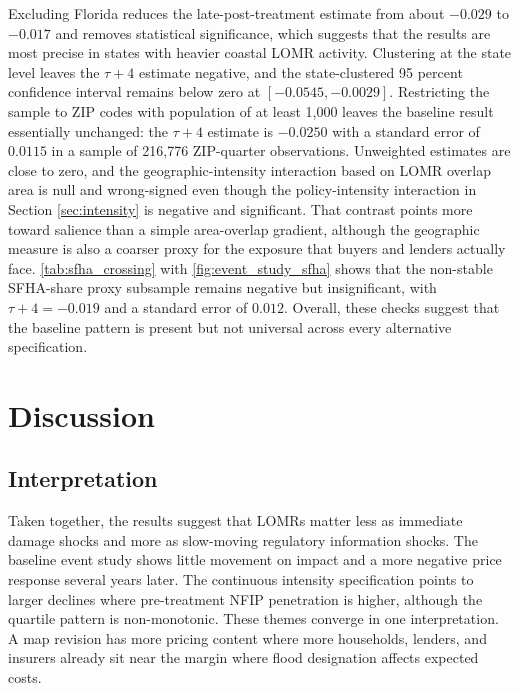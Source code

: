 \documentclass[12pt]{article}
\begin{document}
Excluding Florida reduces the late-post-treatment estimate from about $-0.029$ to $-0.017$ and removes statistical significance, which suggests that the results are most precise in states with heavier coastal LOMR activity. Clustering at the state level leaves the $\tau{+}4$ estimate negative, and the state-clustered 95 percent confidence interval remains below zero at $[-0.0545, -0.0029]$. Restricting the sample to ZIP codes with population of at least 1,000 leaves the baseline result essentially unchanged: the $\tau{+}4$ estimate is $-0.0250$ with a standard error of $0.0115$ in a sample of 216,776 ZIP-quarter observations. Unweighted estimates are close to zero, and the geographic-intensity interaction based on LOMR overlap area is null and wrong-signed even though the policy-intensity interaction in Section \ref{sec:intensity} is negative and significant. That contrast points more toward salience than a simple area-overlap gradient, although the geographic measure is also a coarser proxy for the exposure that buyers and lenders actually face. \autoref{tab:sfha_crossing} with \autoref{fig:event_study_sfha} shows that the non-stable SFHA-share proxy subsample remains negative but insignificant, with $\tau{+}4 = -0.019$ and a standard error of $0.012$. Overall, these checks suggest that the baseline pattern is present but not universal across every alternative specification.


\section{Discussion}\label{sec:discussion}

\subsection{Interpretation}

Taken together, the results suggest that LOMRs matter less as immediate damage shocks and more as slow-moving regulatory information shocks. The baseline event study shows little movement on impact and a more negative price response several years later. The continuous intensity specification points to larger declines where pre-treatment NFIP penetration is higher, although the quartile pattern is non-monotonic. These themes converge in one interpretation. A map revision has more pricing content where more households, lenders, and insurers already sit near the margin where flood designation affects expected costs.
\end{document}
